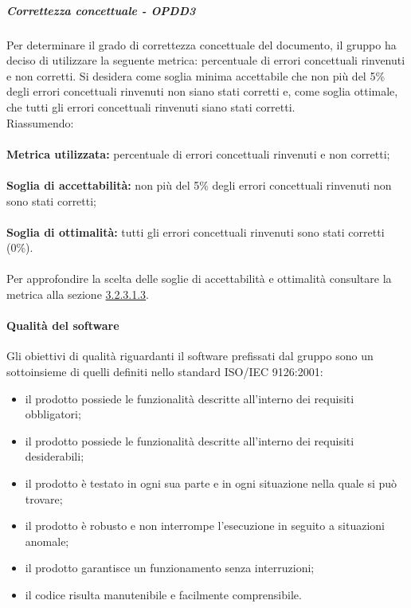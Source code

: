 \documentclass[PianoDiQualifica.tex]{subfiles}
\begin{document}
				\subparagraph{Correttezza concettuale - OPDD3}
				Per determinare il grado di correttezza concettuale del documento, il gruppo ha deciso di utilizzare la seguente metrica: percentuale di errori concettuali rinvenuti e non corretti.
				Si desidera come soglia minima accettabile che non più del 5\% degli errori concettuali rinvenuti non siano stati corretti e, come soglia ottimale, che tutti gli errori
				concettuali rinvenuti siano stati corretti.\\
				Riassumendo: \\ \\
				\textbf{Metrica utilizzata:} percentuale di errori concettuali rinvenuti e non corretti; \\ \\
				\textbf{Soglia di accettabilità:} non più del 5\% degli errori concettuali rinvenuti non sono stati corretti;\\ \\
				\textbf{Soglia di ottimalità:} tutti gli errori concettuali rinvenuti sono stati corretti (0\%). \\ \\
				Per approfondire la scelta delle soglie di accettabilità e ottimalità consultare la metrica alla sezione \hyperlink{err_concettuali}{3.2.3.1.3}.
				
			\paragraph{Qualità del software}
			Gli obiettivi di qualità riguardanti il software prefissati dal gruppo \GRUPPO{} sono un sottoinsieme di quelli definiti nello standard ISO/IEC 9126:2001:
			\begin{itemize}
				\item il prodotto possiede le funzionalità descritte all’interno dei requisiti obbligatori;
				\item il prodotto possiede le funzionalità descritte all’interno dei requisiti desiderabili;
				\item il prodotto è testato in ogni sua parte e in ogni situazione nella quale si può trovare;
				\item il prodotto è robusto e non interrompe l’esecuzione in seguito a situazioni anomale;
				\item il prodotto garantisce un funzionamento senza interruzioni;
				\item il codice risulta manutenibile e facilmente comprensibile.
			\end{itemize}
			
\end{document}
